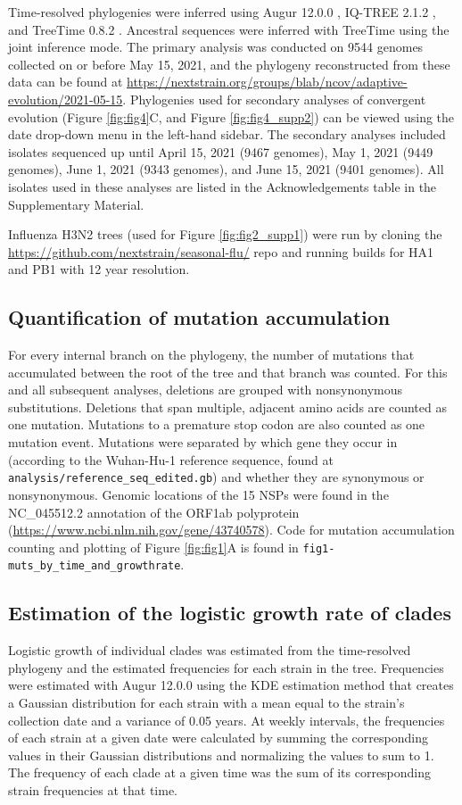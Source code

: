 \documentclass[12pt, letterpaper]{article}
\begin{document}
Time-resolved phylogenies were inferred using Augur 12.0.0 \citep{Huddleston2021-uh}, IQ-TREE 2.1.2 \citep{Nguyen2015-bp}, and TreeTime 0.8.2 \citep{Sagulenko2018-ok}. Ancestral sequences were inferred with TreeTime using the joint inference mode. The primary analysis was conducted on 9544 genomes collected on or before May 15, 2021, and the phylogeny reconstructed from these data can be found at \url{https://nextstrain.org/groups/blab/ncov/adaptive-evolution/2021-05-15}. Phylogenies used for secondary analyses of convergent evolution (Figure \ref{fig:fig4}C, and Figure \ref{fig:fig4_supp2}) can be viewed using the date drop-down menu in the left-hand sidebar. The secondary analyses included isolates sequenced up until April 15, 2021 (9467 genomes), May 1, 2021 (9449 genomes), June 1, 2021 (9343 genomes), and June 15, 2021 (9401 genomes). All isolates used in these analyses are listed in the Acknowledgements table in the Supplementary Material.

Influenza H3N2 trees (used for Figure \ref{fig:fig2_supp1}) were run by cloning the \url{https://github.com/nextstrain/seasonal-flu/} repo and running builds for HA1 and PB1 with 12 year resolution.

\subsection*{Quantification of mutation accumulation}
For every internal branch on the phylogeny, the number of mutations that accumulated between the root of the tree and that branch was counted. For this and all subsequent analyses, deletions are grouped with nonsynonymous substitutions. Deletions that span multiple, adjacent amino acids are counted as one mutation. Mutations to a premature stop codon are also counted as one mutation event. Mutations were separated by which gene they occur in (according to the Wuhan-Hu-1 reference sequence, found at \texttt{analysis/reference\_seq\_edited.gb}) and whether they are synonymous or nonsynonymous. Genomic locations of the 15 NSPs were found in the NC\_045512.2 annotation of the ORF1ab polyprotein (\url{https://www.ncbi.nlm.nih.gov/gene/43740578}). Code for mutation accumulation counting and plotting of Figure \ref{fig:fig1}A is found in \texttt{fig1-muts\_by\_time\_and\_growthrate}.

\subsection*{Estimation of the logistic growth rate of clades}
Logistic growth of individual clades was estimated from the time-resolved phylogeny and the estimated frequencies for each strain in the tree. Frequencies were estimated with Augur 12.0.0 \citep{Huddleston2021-uh} using the KDE estimation method that creates a Gaussian distribution for each strain with a mean equal to the strain’s collection date and a variance of 0.05 years. At weekly intervals, the frequencies of each strain at a given date were calculated by summing the corresponding values in their Gaussian distributions and normalizing the values to sum to 1. The frequency of each clade at a given time was the sum of its corresponding strain frequencies at that time.
\end{document}
